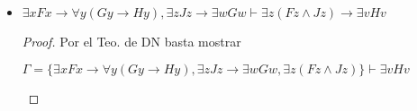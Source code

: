 \documentclass[letterpaper,11pt]{article}
\begin{document}
\begin{enumerate}
\begin{itemize}
\begin{proof}
                de donde, tenemos dos casos:
                \begin{align*}
                    5. \; \; &\Gamma, \neg Fw \vdash \neg Fw
                    && \text{Hip} \\
                    6. \; \; &\Gamma, \neg Fw \vdash \neg Fw \lor \neg Hw
                    && \text{$(\lor I) 5$} \\ 
                    7. \; \; &\Gamma, \neg Fw \vdash \neg (Fw \land Hw)
                    && \text{De Morgan, 6} \\
                    8. \; \; &\Gamma, \neg Fw \vdash \forall w \neg (Fw \land Hw)
                    && \text{$(\forall I) 7$} \\
                    9. \; \; &\Gamma, \neg Gw \vdash \neg Gw
                    && \text{Hip} \\
                    10. \; \; &\Gamma, \neg Gw \vdash \neg Gw \lor \neg Kw
                    && \text{$(\lor I) 9$} \\ 
                    11. \; \; &\Gamma, \neg Gw \vdash \neg (Gw \land Kw)
                    && \text{De Morgan, 10} \\
                    12. \; \; &\Gamma, \neg Gw \vdash \neg Hw
                    && \text{MT 11, 3} \\
                    13.\; \; &\Gamma, \neg Gw \vdash \neg Fw \lor \neg Hw
                    && \text{$(\lor I) 12$} \\
                    14. \; \; &\Gamma, \neg Gw \vdash \neg (Fw \land Hw)
                    && \text{De Morgan, 13} \\
                    15. \; \; &\Gamma, \neg Fw \vdash \forall w \neg (Fw \land Hw)
                    && \text{$(\forall I) 14$} 
                \end{align*}

                Por $(\lor E)$ podemos concluir que $\Gamma \vdash \forall w 
                \neg (Fw \land Hw)$.
                
            \end{proof}

            \item $\exists x Fx \rightarrow \forall y(Gy \rightarrow Hy),
            \exists z Jz \rightarrow \exists w Gw \vdash \exists z(Fz \land Jz)
            \rightarrow \exists v Hv$
            \begin{proof}
                Por el Teo. de DN basta mostrar
                \begin{center}
                    $\Gamma = \{ \exists x Fx \rightarrow 
                    \forall y(Gy \rightarrow Hy), \exists z Jz \rightarrow 
                    \exists w Gw, \exists z(Fz \land Jz) \} \vdash\exists v Hv$
                \end{center}
                

\end{proof}
\end{itemize}
\end{enumerate}
\end{document}

